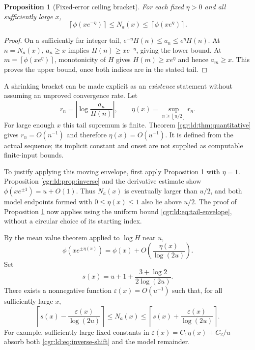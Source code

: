 \documentclass[11pt,letterpaper]{article}
\numberwithin{equation}{section}
\newtheorem{proposition}[theorem]{Proposition}
\theoremstyle{definition}\newtheorem{definition}[theorem]{Definition}
\theoremstyle{remark}\newtheorem{remark}[theorem]{Remark}
\newcommand{\eps}{\varepsilon}
\newcommand{\ceil}[1]{\left\lceil #1\right\rceil}
\newcommand{\floor}[1]{\left\lfloor #1\right\rfloor}
\begin{document}
\begin{proposition}[Fixed-error ceiling bracket]\label{cgr:ld:prop:fixed-bracket}
For each fixed $\eta>0$ and all sufficiently large $x$,
\begin{equation}\label{cgr:ld:eq:eta-bracket}
 \ceil{\phi(xe^{-\eta})}\le N_a(x)
       \le\ceil{\phi(xe^{\eta})}.
\end{equation}
\end{proposition}
\begin{proof}
On a sufficiently far integer tail,
$e^{-\eta}H(n)\le a_n\le e^{\eta}H(n)$. At $n=N_a(x)$,
$a_n\ge x$ implies $H(n)\ge xe^{-\eta}$, giving the lower
bound. At $m=\ceil{\phi(xe^{\eta})}$, monotonicity of $H$
gives $H(m)\ge xe^{\eta}$ and hence $a_m\ge x$. This proves
the upper bound, once both indices are in the stated tail.
\end{proof}

A shrinking bracket can be made explicit as an \emph{existence}
statement without assuming an unproved convergence rate. Let
\begin{equation}\label{cgr:ld:eq:tail-envelope}
 r_n=\left|\log\frac{a_n}{H(n)}\right|,\qquad
 \eta(x)=\sup_{n\ge\floor{u/2}} r_n.
\end{equation}
For large enough $x$ this tail supremum is finite. Theorem
\ref{cgr:ld:thm:quantitative} gives $r_n=O(n^{-1})$ and therefore
$\eta(x)=O(u^{-1})$. It is defined from the actual sequence;
its implicit constant and onset are not supplied as computable
finite-input bounds.

To justify applying this moving envelope, first apply
Proposition \ref{cgr:ld:prop:fixed-bracket} with $\eta=1$.
Proposition \ref{cgr:ld:prop:inverse} and the derivative estimate show
$\phi(xe^{\pm1})=u+O(1)$. Thus $N_a(x)$ is eventually larger
than $u/2$, and both model endpoints formed with
$0\le\eta(x)\le1$ also lie above $u/2$. The proof of
Proposition \ref{cgr:ld:prop:fixed-bracket} now applies using the
uniform bound \eqref{cgr:ld:eq:tail-envelope}, without a circular
choice of its starting index.

By the mean value theorem applied to $\log H$ near $u$,
\begin{equation}\label{cgr:ld:eq:inverse-shift}
 \phi(xe^{\pm\eta(x)})
 =\phi(x)+O\left(\frac{\eta(x)}{\log(2u)}\right).
\end{equation}
Set
\begin{equation}\label{cgr:ld:eq:s}
 s(x)=u+1+\frac{3+\log2}{2\log(2u)}.
\end{equation}
There exists a nonnegative function $\eps(x)=O(u^{-1})$ such that,
for all sufficiently large $x$,
\begin{equation}\label{cgr:ld:eq:shrinking-bracket}
 \ceil{s(x)-\frac{\eps(x)}{\log(2u)}}
 \le N_a(x)\le
 \ceil{s(x)+\frac{\eps(x)}{\log(2u)}}.
\end{equation}
For example, sufficiently large fixed constants in
$\eps(x)=C_1\eta(x)+C_2/u$ absorb both
\eqref{cgr:ld:eq:inverse-shift} and the model remainder.
\end{document}
